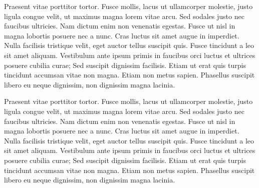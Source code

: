 		\selectfont
		
		Praesent vitae porttitor tortor. Fusce mollis, lacus ut ullamcorper molestie, justo ligula congue velit, ut maximus magna lorem vitae arcu. Sed sodales justo nec faucibus ultricies. Nam dictum enim non venenatis egestas. Fusce ut nisl in magna lobortis posuere nec a nunc. Cras luctus sit amet augue in imperdiet. Nulla facilisis tristique velit, eget auctor tellus suscipit quis. Fusce tincidunt a leo sit amet aliquam. Vestibulum ante ipsum primis in faucibus orci luctus et ultrices posuere cubilia curae; Sed suscipit dignissim facilisis. Etiam ut erat quis turpis tincidunt accumsan vitae non magna. Etiam non metus sapien. Phasellus suscipit libero eu neque dignissim, non dignissim magna lacinia.
		
		Praesent vitae porttitor tortor. Fusce mollis, lacus ut ullamcorper molestie, justo ligula congue velit, ut maximus magna lorem vitae arcu. Sed sodales justo nec faucibus ultricies. Nam dictum enim non venenatis egestas. Fusce ut nisl in magna lobortis posuere nec a nunc. Cras luctus sit amet augue in imperdiet. Nulla facilisis tristique velit, eget auctor tellus suscipit quis. Fusce tincidunt a leo sit amet aliquam. Vestibulum ante ipsum primis in faucibus orci luctus et ultrices posuere cubilia curae; Sed suscipit dignissim facilisis. Etiam ut erat quis turpis tincidunt accumsan vitae non magna. Etiam non metus sapien. Phasellus suscipit libero eu neque dignissim, non dignissim magna lacinia.
		
	
	
	
	

